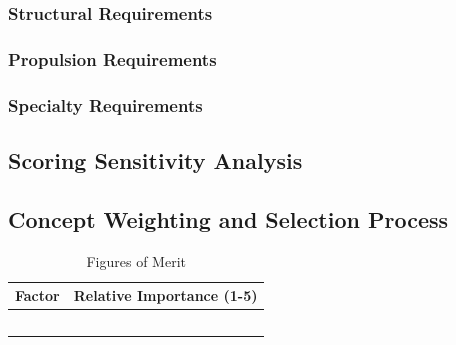 \documentclass[report]{byu-aero}
\begin{document}
\subsubsection{Structural Requirements}
\label{sssec:structreqs}


\subsubsection{Propulsion Requirements}
\label{sssec:propreqs}


\subsubsection{Specialty Requirements} %
\label{sssec:specialreqs}



\subsection{Scoring Sensitivity Analysis}
\label{ssec:scoringsensitivity}



\subsection{Concept Weighting and Selection Process}
\label{ssec:selectionprocess}


\begin{table}[h!]
	\centering
	\caption{Figures of Merit}
	\label{tab:fom}
	\begin{tabular}{ |c|c| } 
		\hline
		\rowcolor{BYUbluemid}
    	Factor & Relative Importance (1-5) \\ 
		\hline
	     &  \\ 
		\hline
		 &  \\ 
		\hline
		 &  \\ 
		\hline
		 &  \\ 
		\hline
		 &  \\ 
		\hline
	\end{tabular}
\end{table}
\end{document}
